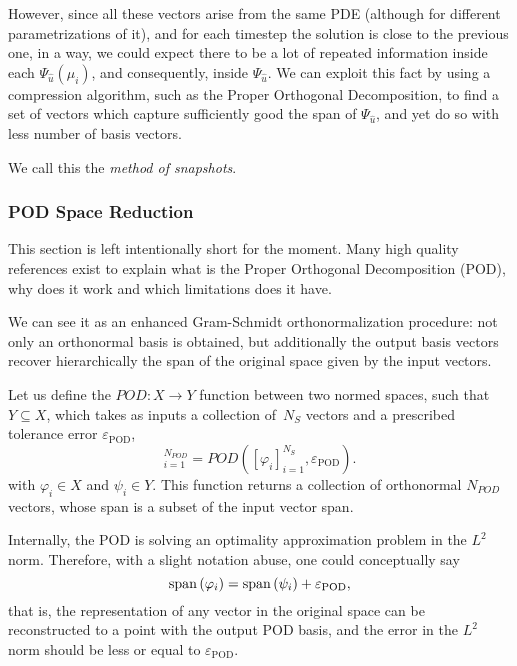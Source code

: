 \documentclass[../main.tex]{subfiles}
\newcommand{\epspod}{\ensuremath{\varepsilon_\text{POD}}}
\begin{document}
However, since all these vectors arise from the same PDE (although for different parametrizations of it), and for each timestep the solution is close to the previous one, in a way, we could expect there to be a lot of repeated information inside each $\Psi_{\hat{u}}(\mu_i)$, and consequently, inside $\Psi_{\hat{u}}$.
We can exploit this fact by using a compression algorithm, such as the Proper Orthogonal Decomposition, to find a set of vectors which capture sufficiently good the span of $\Psi_{\hat{u}}$, and yet do so with less number of basis vectors. 

We call this the \emph{method of snapshots}. 

\subsubsection{POD Space Reduction}
\label{sec:1d_rom_heat_equation_basis_construction_pod}
This section is left intentionally short for the moment.
Many high quality references exist to explain what is the Proper Orthogonal Decomposition (POD), why does it work and which limitations does it have.

We can see it as an enhanced Gram-Schmidt orthonormalization procedure: not only an orthonormal basis is obtained, but additionally the output basis vectors recover hierarchically the span of the original space given by the input vectors.

Let us define the $POD: X \rightarrow Y$ function between two normed spaces, 
such that $Y \subseteq  X$, 
which takes as inputs a collection of~$N_S$ vectors and a prescribed tolerance error $\epspod$,
\begin{equation}
    [\psi_i]_{i=1}^{N_{POD}} = POD\left([\varphi_i]_{i=1}^{N_S}, \epspod\right).
\end{equation}
with $\varphi_i \in X$ and $\psi_i \in Y$.
This function returns a collection of orthonormal $N_{POD}$ vectors, whose span is a subset of the input vector span.

Internally, the POD is solving an optimality approximation problem in the $L^2$ norm. 
Therefore, with a slight notation abuse, one could conceptually say
\begin{equation}
    \spn{\varphi_i} = \spn{\psi_i} + \epspod,
\end{equation}
that is, the representation of any vector in the original space can be reconstructed to a point with the output POD basis, 
and the error in the $L^2$ norm should be less or equal to \epspod.
\end{document}
